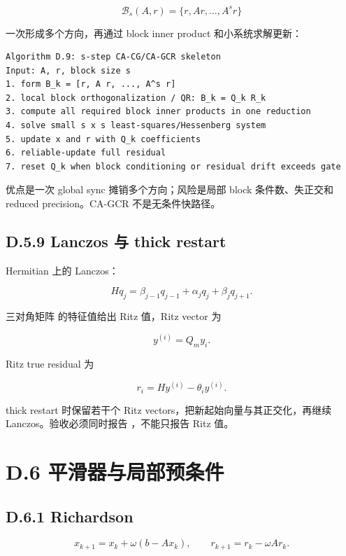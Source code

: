 \documentclass[UTF8,a4paper,10pt]{ctexart}
\DeclareRobustCommand{\pycode}[1]{\texorpdfstring{\texttt{\seqsplit{#1}}}{#1}}
\begin{document}
\begin{displaymath}
\mathcal B_s(A,r)=\{r,Ar,\ldots,A^sr\}
\end{displaymath}

一次形成多个方向，再通过 block inner product 和小系统求解更新：

\begin{Verbatim}[breaklines=true,breakanywhere=true,fontsize=\scriptsize]
Algorithm D.9: s-step CA-CG/CA-GCR skeleton
Input: A, r, block size s
1. form B_k = [r, A r, ..., A^s r]
2. local block orthogonalization / QR: B_k = Q_k R_k
3. compute all required block inner products in one reduction
4. solve small s x s least-squares/Hessenberg system
5. update x and r with Q_k coefficients
6. reliable-update full residual
7. reset Q_k when block conditioning or residual drift exceeds gate
\end{Verbatim}
优点是一次 global sync 摊销多个方向；风险是局部 block 条件数、失正交和 reduced precision。CA-GCR 不是无条件快路径。

\subsection{D.5.9 Lanczos 与 thick restart}
Hermitian \pycode{H} 上的 Lanczos：

\begin{displaymath}
Hq_j=\beta_{j-1}q_{j-1}+\alpha_jq_j+\beta_jq_{j+1}.
\end{displaymath}

三对角矩阵 \pycode{T\_m} 的特征值给出 Ritz 值，Ritz vector 为

\begin{displaymath}
y^{(i)}=Q_my_i.
\end{displaymath}

Ritz true residual 为

\begin{displaymath}
r_i=Hy^{(i)}-\theta_iy^{(i)}.
\end{displaymath}

thick restart 时保留若干个 Ritz vectors，把新起始向量与其正交化，再继续 Lanczos。验收必须同时报告 \pycode{||r\_i||}，不能只报告 Ritz 值。

\section{D.6 平滑器与局部预条件}
\subsection{D.6.1 Richardson}
\begin{displaymath}
x_{k+1}=x_k+\omega(b-Ax_k), \qquad r_{k+1}=r_k-\omega Ar_k.
\end{displaymath}
\end{document}
